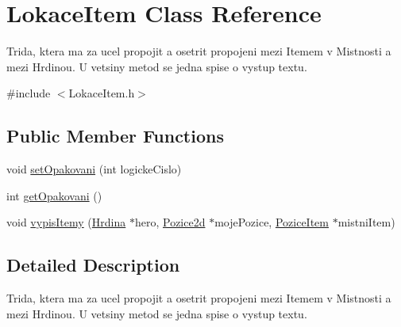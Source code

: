 \hypertarget{class_lokace_item}{\section{Lokace\-Item Class Reference}
\label{class_lokace_item}
}


Trida, ktera ma za ucel propojit a osetrit propojeni mezi Itemem v Mistnosti a mezi Hrdinou. U vetsiny metod se jedna spise o vystup textu.  




{\ttfamily \#include $<$Lokace\-Item.\-h$>$}

\subsection*{Public Member Functions}
\begin{DoxyCompactItemize}
\item 
void \hyperlink{class_lokace_item_a853aaeba66d641d9199e3129e305dc08}{set\-Opakovani} (int logicke\-Cislo)
\item 
int \hyperlink{class_lokace_item_a63384e12f4b785443581323ef0f6afcb}{get\-Opakovani} ()
\item 
void \hyperlink{class_lokace_item_afcc5288c13964846ac493a35bc2877dd}{vypis\-Itemy} (\hyperlink{class_hrdina}{Hrdina} $\ast$hero, \hyperlink{struct_pozice2d}{Pozice2d} $\ast$moje\-Pozice, \hyperlink{class_pozice_item}{Pozice\-Item} $\ast$mistni\-Item)
\end{DoxyCompactItemize}


\subsection{Detailed Description}
Trida, ktera ma za ucel propojit a osetrit propojeni mezi Itemem v Mistnosti a mezi Hrdinou. U vetsiny metod se jedna spise o vystup textu. 


